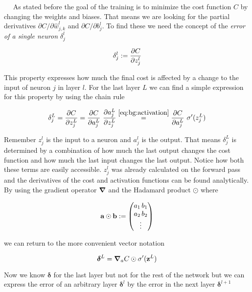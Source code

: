 $\quad$ As stated before the goal of the training is to minimize the cost function $C$ by changing the weights and biases. That means we are looking for the partial derivatives $\partial C / \partial \hat w^l_{j,k}$ and
$\partial C / \partial b^l_j$. To find these we need the concept of the \textit{error of a single neuron} $\delta^l_j$

\begin{equation} 
    \delta^l_j := \pdv{C}{z^l_j}
\end{equation}

This property expresses how much the final cost is affected by a change to the input of neuron $j$ in layer $l$. For the last layer $L$ we can find a simple expression for this property by using the chain rule

\begin{equation} \label{eq:bg:back_prop}
    \delta^L_j = \pdv{C}{z^L_j} = \pdv{C}{a^L_j} \ \pdv{a^L_j}{z^L_j}
    \stackrel{\eqref{eq:bg:activation}}{=}
    \pdv{C}{a^L_j} \ \sigma'(z^L_j)
\end{equation}

Remember $z^l_j$ is the input to a neuron and $a^l_j$ is the output. That means $\delta^L_j$ is determined by a combination of how much the last output changes the cost function and how much the last input changes the last output. Notice how both these terms are easily accessible. $z^l_j$ was already calculated on the forward pass and the derivatives of the cost and activation functions can be found analytically. By using the gradient operator $\grad$ and the Hadamard product $\odot$ where

\begin{equation}
    \vb a \odot \vb b :=
    \begin{pmatrix}
        a_1 \, b_1 \\
        a_2 \, b_2 \\
        \vdots
    \end{pmatrix}
\end{equation}

we can return to the more convenient vector notation

\begin{equation} \label{eq:bg:back1}
    \boldsymbol \delta^L = \grad_a C  \odot \sigma'(\vb z^L)
\end{equation}

Now we know $\boldsymbol \delta$ for the last layer but not for the rest of the network but we can express the error of an arbitrary layer $\boldsymbol \delta^l$ by the error in the next layer $\boldsymbol \delta^{l+1}$

